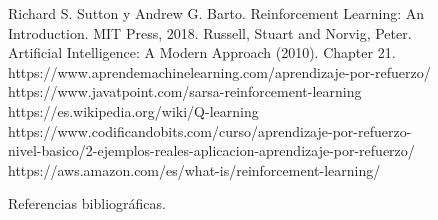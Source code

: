 \documentclass[conference,a4paper]{IEEEtran}
\begin{document}
\begin{figure}[h!]
  \begin{thebibliography}{99}
   Richard S. Sutton y Andrew G. Barto. Reinforcement Learning: An Introduction.
  MIT Press, 2018.
    Russell, Stuart and Norvig, Peter. Artificial Intelligence: A Modern Approach
  (2010). Chapter 21.
   https://www.aprendemachinelearning.com/aprendizaje-por-refuerzo/
   https://www.javatpoint.com/sarsa-reinforcement-learning
   https://es.wikipedia.org/wiki/Q-learning
   https://www.codificandobits.com/curso/aprendizaje-por-refuerzo-nivel-basico/2-ejemplos-reales-aplicacion-aprendizaje-por-refuerzo/
   https://aws.amazon.com/es/what-is/reinforcement-learning/

  \end{thebibliography}
  \caption{Referencias bibliográficas.}
  \label{fig:bibliography}
  \end{figure}
  
\end{document}
